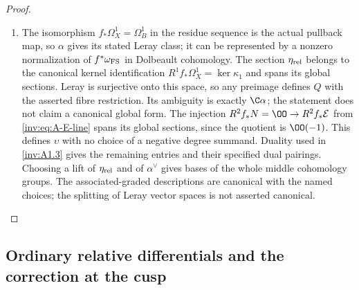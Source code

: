 \begin{proof}
\begin{enumerate}[label=\arabic*.,leftmargin=*]
\item The isomorphism $f_*\Omega_X^1=\Omega_B^1$ in the residue sequence
is the actual pullback map, so $\alpha$ gives its stated Leray
class; it can be represented by a nonzero normalization of
$f^*\omega_{\rm FS}$ in Dolbeault cohomology.  The section
$\eta_{\rm rel}$ belongs to the canonical kernel identification
$R^1f_*\Omega_X^1=\ker\kappa_1$ and spans its global sections.
Leray is surjective onto this space, so any preimage defines $Q$
with the asserted fibre restriction.  Its ambiguity is exactly
$\C\alpha$; the statement does not claim a canonical global form.
The injection $R^2f_*N=\OO\to R^2f_*\mathcal E$ from
\eqref{inv:eq:A-E-line} spans its global sections, since the quotient
is $\OO(-1)$.  This defines $\upsilon$ with no choice of a negative
degree summand.  Duality used in \ref{inv:A1.3} gives the remaining entries
and their specified dual pairings.  Choosing a lift of
$\eta_{\rm rel}$ and of $\alpha^\vee$ gives bases of the whole
middle cohomology groups.  The associated-graded descriptions are
canonical with the named choices; the splitting of Leray vector
spaces is not asserted canonical.
\end{enumerate}
\end{proof}

\subsection{Ordinary relative differentials and the correction at the cusp}

